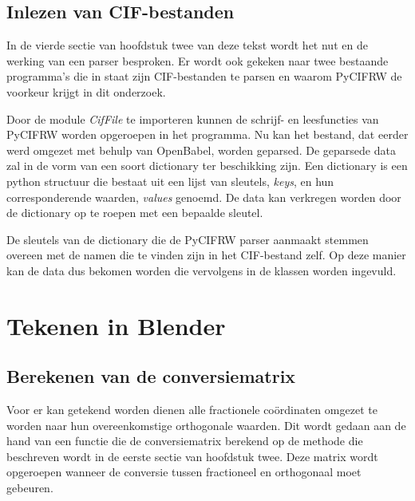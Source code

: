 \subsection{Inlezen van CIF-bestanden}
In de vierde sectie van hoofdstuk twee van deze tekst wordt het nut en de werking van een parser besproken. Er wordt ook gekeken naar twee bestaande programma's die in staat zijn CIF-bestanden te parsen en waarom PyCIFRW de voorkeur krijgt in dit onderzoek.
\par
Door de module \textit{CifFile} te importeren kunnen de schrijf- en leesfuncties van PyCIFRW worden opgeroepen in het programma. Nu kan het bestand, dat eerder werd omgezet met behulp van OpenBabel, worden geparsed. De geparsede data zal in de vorm van een soort dictionary ter beschikking zijn. Een dictionary is een python structuur die bestaat uit een lijst van sleutels, \textit{keys}, en hun corresponderende waarden, \textit{values} genoemd. De data kan verkregen worden door de dictionary op te roepen met een bepaalde sleutel.
\par
De sleutels van de dictionary die de PyCIFRW parser aanmaakt stemmen overeen met de namen die te vinden zijn in het CIF-bestand zelf. Op deze manier kan de data dus bekomen worden die vervolgens in de klassen worden ingevuld.

\section{Tekenen in Blender}
\subsection{Berekenen van de conversiematrix}
Voor er kan getekend worden dienen alle fractionele coördinaten omgezet te worden  naar hun overeenkomstige orthogonale waarden. Dit wordt gedaan aan de hand van een functie die de conversiematrix berekend op de methode die beschreven wordt in de eerste sectie van hoofdstuk twee. Deze matrix wordt opgeroepen wanneer de conversie tussen fractioneel en orthogonaal moet gebeuren.

